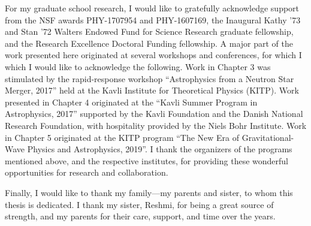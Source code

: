 For my graduate school research, I would like to gratefully acknowledge support from the NSF awards PHY-1707954 and PHY-1607169, the Inaugural Kathy '73 and Stan '72 Walters Endowed Fund for Science Research graduate fellowship, and the Research Excellence Doctoral Funding fellowship. A major part of the work presented here originated at several workshops and conferences, for which I which I would like to acknowledge the following. Work in Chapter 3 was stimulated by the rapid-response workshop ``Astrophysics from a Neutron Star Merger, 2017'' held at the Kavli Institute for Theoretical Physics (KITP). Work presented in Chapter 4 originated at the ``Kavli Summer Program in Astrophysics, 2017'' supported by the Kavli Foundation and the Danish National Research Foundation, with hospitality provided by the Niels Bohr Institute. Work in Chapter 5 originated at the KITP program ``The New Era of Gravitational-Wave Physics and Astrophysics, 2019''. I thank the organizers of the programs mentioned above, and the respective institutes, for providing these wonderful opportunities for research and collaboration.

Finally, I would like to thank my family---my parents and sister, to whom this thesis is dedicated. I thank my sister, Reshmi, for being a great source of strength, and my parents for their care, support, and time over the years.



